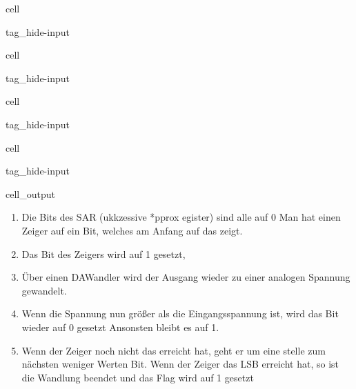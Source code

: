 \documentclass[letterpaper,10pt,english]{jupyterBook}
\begin{document}
\begin{sphinxuseclass}{cell}
\begin{sphinxuseclass}{tag_hide-input}
\end{sphinxuseclass}
\end{sphinxuseclass}
\begin{sphinxuseclass}{cell}
\begin{sphinxuseclass}{tag_hide-input}
\end{sphinxuseclass}
\end{sphinxuseclass}
\begin{sphinxuseclass}{cell}
\begin{sphinxuseclass}{tag_hide-input}
\end{sphinxuseclass}
\end{sphinxuseclass}
\begin{sphinxuseclass}{cell}
\begin{sphinxuseclass}{tag_hide-input}\begin{sphinxVerbatimOutput}

\begin{sphinxuseclass}{cell_output}
\noindent{}

\end{sphinxuseclass}\end{sphinxVerbatimOutput}

\end{sphinxuseclass}
\end{sphinxuseclass}
\begin{DUlineblock}{0em}
\item[] 
\end{DUlineblock}
\begin{enumerate}
%
\item {} 
\sphinxAtStartPar
Die Bits des SAR (ukkzessive *pprox egister) sind alle auf 0
Man hat einen Zeiger auf ein Bit,
welches am Anfang auf das  zeigt.

\item {} 
\sphinxAtStartPar
Das Bit des Zeigers wird auf 1 gesetzt,

\item {} 
\sphinxAtStartPar
Über einen DA\sphinxhyphen{}Wandler wird der Ausgang wieder zu einer analogen Spannung gewandelt.

\item {} 
\sphinxAtStartPar
Wenn die Spannung nun größer als die Eingangsspannung ist,
wird das Bit wieder auf 0 gesetzt
Ansonsten bleibt es auf 1.

\item {} 
\sphinxAtStartPar
Wenn der Zeiger noch nicht das  erreicht hat,
geht er um eine stelle zum nächsten weniger Werten Bit.
Wenn der Zeiger das LSB erreicht hat,
so ist die Wandlung beendet und das \sphinxhyphen{}Flag wird auf 1 gesetzt

\end{enumerate}
\end{document}
